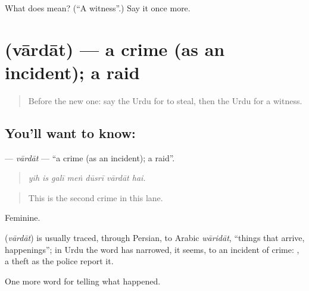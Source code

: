\begin{tcolorbox}[breakable,colback=teal!4,colframe=teal!35!black,title={Before you move on}]
What does  mean? (\textquotedblleft{}A witness\textquotedblright{}.) Say it once more.
\end{tcolorbox}
\section[\texorpdfstring{\ur{واردات} (vārdāt)}{واردات (vārdāt)}]{ (vārdāt) — a crime (as an incident); a raid}

\label{lesson:UR-C276-vardat}



\begin{quote}
Before the new one: say the Urdu for to steal, then the Urdu for a witness.
\end{quote}

\subsection*{You'll want to know: }
\textbf{} — \emph{vārdāt} — \textquotedblleft{}a crime (as an incident); a raid\textquotedblright{}.

\begin{quote}
      
\end{quote}

\begin{quote}
\emph{yih is galī meṅ dūsrī vārdāt hai.}
\end{quote}

\begin{quote}
This is the second crime in this lane.
\end{quote}

Feminine.

\begin{cousinweb}
\textbf{} (\emph{vārdāt}) is usually traced, through Persian, to Arabic \emph{wāridāt}, \textquotedblleft{}things that arrive, happenings\textquotedblright{}; in Urdu the word has narrowed, it seems, to an incident of crime: \textbf{  }, a theft as the police report it.
\end{cousinweb}

\begin{grammarlens}[title={What you've built}]
One more word for telling what happened.
\end{grammarlens}

